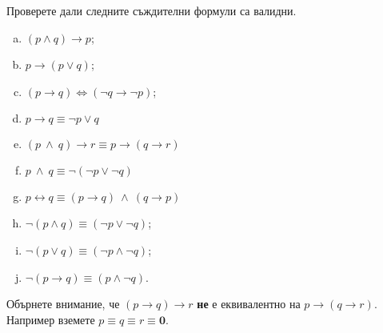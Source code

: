 
\begin{problem}
  Проверете дали следните съждителни формули са валидни.
  \begin{enumerate}[a)]
  \item
    $(p\wedge q)\rightarrow p$;
  \item
    $p\rightarrow(p\vee q)$;
  \item
    $(p\rightarrow q) \iff (\neg q \rightarrow \neg p)$;
  \item
    $p\rightarrow q \equiv \neg p \vee q$
  \item
    $(p\ \wedge\ q) \rightarrow r \equiv p \rightarrow (q\rightarrow r)$
  \item
    $p\ \wedge\ q \equiv \neg(\neg p \vee \neg q)$
  \item
    $p \leftrightarrow q \equiv (p\rightarrow q)\ \wedge\ (q\rightarrow p)$
  \item
    $\neg(p\wedge q) \equiv (\neg p \vee \neg q)$;
  \item
    $\neg(p\vee q) \equiv (\neg p \wedge \neg q)$;
  \item
    $\neg(p\rightarrow q) \equiv (p\wedge \neg q)$.
  \end{enumerate}
\end{problem}

\begin{remark}
  Обърнете внимание, че $(p\rightarrow q)\rightarrow r$ {\bf не} е еквивалентно на $p\rightarrow (q\rightarrow r)$.
  Например вземете $p \equiv q \equiv r \equiv \mathbf{0}$.
\end{remark}


